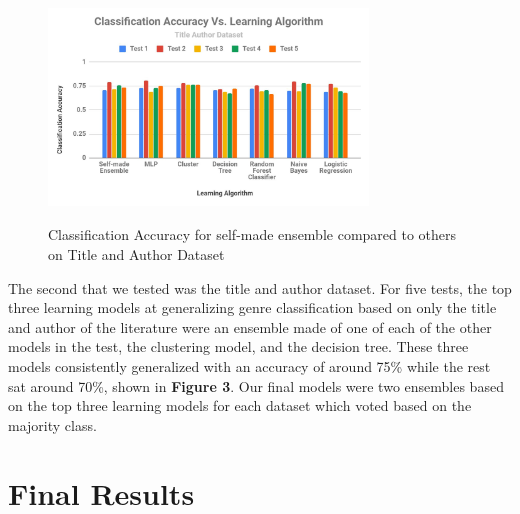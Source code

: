 \documentclass{article}
\begin{document}
\begin{figure}
  \includegraphics[width=8.5cm,height=6cm]{Figure3.JPG}
  \caption{Classification Accuracy for self-made ensemble compared to others on Title and Author Dataset}
\end{figure}

The second that we tested was the title and author dataset. For five tests, the top three learning models at generalizing genre classification based on only the title and author of the literature were an ensemble made of one of each of the other models in the test, the clustering model, and the decision tree. These three models consistently generalized with an accuracy of around 75\% while the rest sat around 70\%, shown in \textbf{Figure 3}. 
Our final models were two ensembles based on the top three learning models for each dataset which voted based on the majority class.

\section{Final Results}
\end{document}
